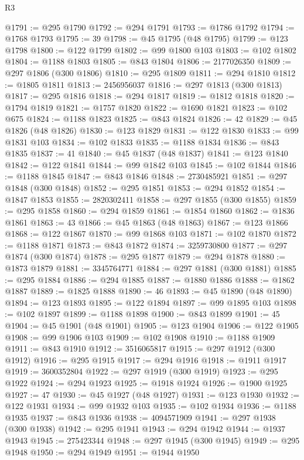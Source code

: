 \begin{lexlean}{R3}
\begin{coremodule}
@1791 := @295 @1790
@1792 := @294 @1791
@1793 := @1786 @1792
@1794 := @1768 @1793
@1795 := 39
@1798 := @45 @1795 (@48 @1795)
@1799 := @123 @1798
@1800 := @122 @1799
@1802 := @99 @1800 @103
@1803 := @102 @1802
@1804 := @1188 @1803
@1805 := @843 @1804
@1806 := 2177026350
@1809 := @297 @1806 (@300 @1806)
@1810 := @295 @1809
@1811 := @294 @1810
@1812 := @1805 @1811
@1813 := 2456956037
@1816 := @297 @1813 (@300 @1813)
@1817 := @295 @1816
@1818 := @294 @1817
@1819 := @1812 @1818
@1820 := @1794 @1819
@1821 := @1757 @1820
@1822 := @1690 @1821
@1823 := @102 @675
@1824 := @1188 @1823
@1825 := @843 @1824
@1826 := 42
@1829 := @45 @1826 (@48 @1826)
@1830 := @123 @1829
@1831 := @122 @1830
@1833 := @99 @1831 @103
@1834 := @102 @1833
@1835 := @1188 @1834
@1836 := @843 @1835
@1837 := 41
@1840 := @45 @1837 (@48 @1837)
@1841 := @123 @1840
@1842 := @122 @1841
@1844 := @99 @1842 @103
@1845 := @102 @1844
@1846 := @1188 @1845
@1847 := @843 @1846
@1848 := 2730485921
@1851 := @297 @1848 (@300 @1848)
@1852 := @295 @1851
@1853 := @294 @1852
@1854 := @1847 @1853
@1855 := 2820302411
@1858 := @297 @1855 (@300 @1855)
@1859 := @295 @1858
@1860 := @294 @1859
@1861 := @1854 @1860
@1862 := @1836 @1861
@1863 := 43
@1866 := @45 @1863 (@48 @1863)
@1867 := @123 @1866
@1868 := @122 @1867
@1870 := @99 @1868 @103
@1871 := @102 @1870
@1872 := @1188 @1871
@1873 := @843 @1872
@1874 := 3259730800
@1877 := @297 @1874 (@300 @1874)
@1878 := @295 @1877
@1879 := @294 @1878
@1880 := @1873 @1879
@1881 := 3345764771
@1884 := @297 @1881 (@300 @1881)
@1885 := @295 @1884
@1886 := @294 @1885
@1887 := @1880 @1886
@1888 := @1862 @1887
@1889 := @1825 @1888
@1890 := 46
@1893 := @45 @1890 (@48 @1890)
@1894 := @123 @1893
@1895 := @122 @1894
@1897 := @99 @1895 @103
@1898 := @102 @1897
@1899 := @1188 @1898
@1900 := @843 @1899
@1901 := 45
@1904 := @45 @1901 (@48 @1901)
@1905 := @123 @1904
@1906 := @122 @1905
@1908 := @99 @1906 @103
@1909 := @102 @1908
@1910 := @1188 @1909
@1911 := @843 @1910
@1912 := 3516065817
@1915 := @297 @1912 (@300 @1912)
@1916 := @295 @1915
@1917 := @294 @1916
@1918 := @1911 @1917
@1919 := 3600352804
@1922 := @297 @1919 (@300 @1919)
@1923 := @295 @1922
@1924 := @294 @1923
@1925 := @1918 @1924
@1926 := @1900 @1925
@1927 := 47
@1930 := @45 @1927 (@48 @1927)
@1931 := @123 @1930
@1932 := @122 @1931
@1934 := @99 @1932 @103
@1935 := @102 @1934
@1936 := @1188 @1935
@1937 := @843 @1936
@1938 := 4094571909
@1941 := @297 @1938 (@300 @1938)
@1942 := @295 @1941
@1943 := @294 @1942
@1944 := @1937 @1943
@1945 := 275423344
@1948 := @297 @1945 (@300 @1945)
@1949 := @295 @1948
@1950 := @294 @1949
@1951 := @1944 @1950

\end{coremodule}
\end{lexlean}
